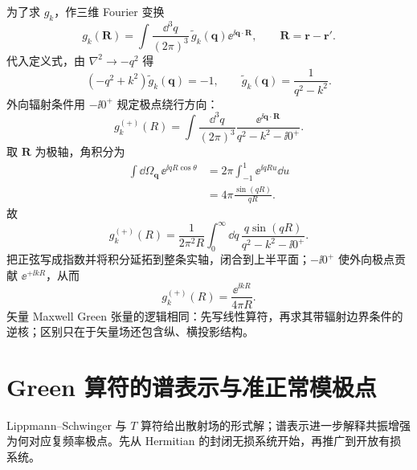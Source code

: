 为了求 $g_k$，作三维 Fourier 变换
\begin{equation}
g_k(\bm R)=\int\frac{\dd^3q}{(2\pi)^3}\,
\widetilde g_k(\bm q)\ee^{\ii\bm q\cdot\bm R},
\qquad \bm R=\bm r-\bm r'.
\end{equation}
代入定义式，由 $\nabla^2\to-q^2$ 得
\begin{equation}
(-q^2+k^2)\widetilde g_k(\bm q)=-1,
\qquad
\widetilde g_k(\bm q)=\frac{1}{q^2-k^2}.
\end{equation}
外向辐射条件用 $-\ii0^+$ 规定极点绕行方向：
\begin{equation}
g_k^{(+)}(R)
=\int\frac{\dd^3q}{(2\pi)^3}
\frac{\ee^{\ii\bm q\cdot\bm R}}{q^2-k^2-\ii0^+}.
\end{equation}
取 $\bm R$ 为极轴，角积分为
\begin{align}
\int \dd\Omega_{\bm q}\,\ee^{\ii qR\cos\theta}
&=2\pi\int_{-1}^{1}\ee^{\ii qRu}\dd u\\
&=4\pi\frac{\sin(qR)}{qR}.
\end{align}
故
\begin{equation}
g_k^{(+)}(R)
=\frac{1}{2\pi^2R}
\int_0^\infty \dd q\,
\frac{q\sin(qR)}{q^2-k^2-\ii0^+}.
\end{equation}
把正弦写成指数并将积分延拓到整条实轴，闭合到上半平面；$-\ii0^+$ 使外向极点贡献 $\ee^{+\ii kR}$，从而
\begin{equation}
\boxed{g_k^{(+)}(R)=\frac{\ee^{\ii kR}}{4\pi R}.}
\label{eq:scalar-green-outgoing}
\end{equation}
矢量 Maxwell Green 张量的逻辑相同：先写线性算符，再求其带辐射边界条件的逆核；区别只在于矢量场还包含纵、横投影结构。



\section{Green 算符的谱表示与准正常模极点}

Lippmann--Schwinger 与 $T$ 算符给出散射场的形式解；谱表示进一步解释共振增强为何对应复频率极点。先从 Hermitian 的封闭无损系统开始，再推广到开放有损系统。

